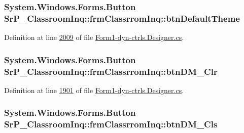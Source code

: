 \hypertarget{class_sr_p___classroom_inq_1_1frm_classrrom_inq_a17fc9570ddfb13b5334d6f36eb6e7800}{
\subsubsection[{btn\-Default\-Theme}]{\setlength{\rightskip}{0pt plus 5cm}\-System.\-Windows.\-Forms.\-Button {\bf \-Sr\-P\-\_\-\-Classroom\-Inq\-::frm\-Classrrom\-Inq\-::btn\-Default\-Theme}}}
\label{class_sr_p___classroom_inq_1_1frm_classrrom_inq_a17fc9570ddfb13b5334d6f36eb6e7800}


\-Definition at line \hyperlink{_form1-dyn-ctrls_8_designer_8cs_source_l02009}{2009} of file \hyperlink{_form1-dyn-ctrls_8_designer_8cs_source}{\-Form1-\/dyn-\/ctrls.\-Designer.\-cs}.

\hypertarget{class_sr_p___classroom_inq_1_1frm_classrrom_inq_a81852ce0a99da9e3b5838befcb9daedc}{
\subsubsection[{btn\-D\-M\-\_\-\-Clr}]{\setlength{\rightskip}{0pt plus 5cm}\-System.\-Windows.\-Forms.\-Button {\bf \-Sr\-P\-\_\-\-Classroom\-Inq\-::frm\-Classrrom\-Inq\-::btn\-D\-M\-\_\-\-Clr}}}
\label{class_sr_p___classroom_inq_1_1frm_classrrom_inq_a81852ce0a99da9e3b5838befcb9daedc}


\-Definition at line \hyperlink{_form1-dyn-ctrls_8_designer_8cs_source_l01901}{1901} of file \hyperlink{_form1-dyn-ctrls_8_designer_8cs_source}{\-Form1-\/dyn-\/ctrls.\-Designer.\-cs}.

\hypertarget{class_sr_p___classroom_inq_1_1frm_classrrom_inq_a2e01fdc50400702fd6df6d5d785ddb4d}{
\subsubsection[{btn\-D\-M\-\_\-\-Cls}]{\setlength{\rightskip}{0pt plus 5cm}\-System.\-Windows.\-Forms.\-Button {\bf \-Sr\-P\-\_\-\-Classroom\-Inq\-::frm\-Classrrom\-Inq\-::btn\-D\-M\-\_\-\-Cls}}}
\label{class_sr_p___classroom_inq_1_1frm_classrrom_inq_a2e01fdc50400702fd6df6d5d785ddb4d}


